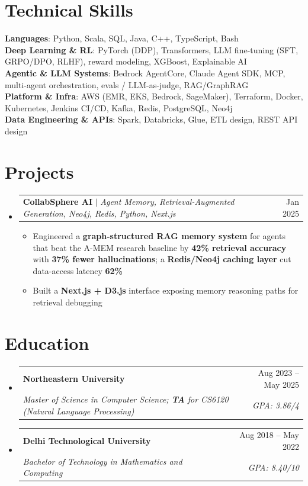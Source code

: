 \documentclass[10pt,letterpaper]{article}
\makeatletter
\newcommand{\resumeItem}[1]{
  \item\small{
    {#1 \vspace{-2pt}}
  }
}
\newcommand{\resumeSubheading}[4]{
  \vspace{-2pt}\item
    \begin{tabular*}{0.97\textwidth}[t]{l@{\extracolsep{\fill}}r}
      \textbf{#1} & #2 \\
      \textit{\small#3} & \textit{\small #4} \\
    \end{tabular*}\vspace{-7pt}
}
\newcommand{\resumeProjectHeading}[2]{
    \item
    \begin{tabular*}{0.97\textwidth}{l@{\extracolsep{\fill}}r}
      \small#1 & #2 \\
    \end{tabular*}\vspace{-7pt}
}
\newcommand{\resumeSubHeadingListStart}{\begin{itemize}[leftmargin=0.15in, label={}]}
\newcommand{\resumeSubHeadingListEnd}{\end{itemize}}
\newcommand{\resumeItemListStart}{\begin{itemize}}
\newcommand{\resumeItemListEnd}{\end{itemize}\vspace{-6pt}}
\makeatother
\begin{document}
\section{Technical Skills}
 \begin{itemize}[leftmargin=0.15in, label={}]
    \small{\item{
     \textbf{Languages}{: Python, Scala, SQL, Java, C++, TypeScript, Bash} \\

     \textbf{Deep Learning \& RL}{: PyTorch (DDP), Transformers, LLM fine-tuning (SFT, GRPO/DPO, RLHF), reward modeling, XGBoost, Explainable AI} \\

     \textbf{Agentic \& LLM Systems}{: Bedrock AgentCore, Claude Agent SDK, MCP, multi-agent orchestration, evals / LLM-as-judge, RAG/GraphRAG} \\

     \textbf{Platform \& Infra}{: AWS (EMR, EKS, Bedrock, SageMaker), Terraform, Docker, Kubernetes, Jenkins CI/CD, Kafka, Redis, PostgreSQL, Neo4j} \\

     \textbf{Data Engineering \& APIs}{: Spark, Databricks, Glue, ETL design, REST API design}
     }}
 \end{itemize}


\section{Projects}
    \resumeSubHeadingListStart

  \resumeProjectHeading
 {\textbf{CollabSphere AI} $|$ \emph{Agent Memory, Retrieval-Augmented Generation, Neo4j, Redis, Python, Next.js}}{Jan 2025}
 \resumeItemListStart
   \resumeItem{Engineered a \textbf{graph-structured RAG memory system} for agents that beat the A-MEM research baseline by \textbf{42\% retrieval accuracy} with \textbf{37\% fewer hallucinations}; a \textbf{Redis/Neo4j caching layer} cut data-access latency \textbf{62\%}}
   \resumeItem{Built a \textbf{Next.js + D3.js} interface exposing memory reasoning paths for retrieval debugging}
 \resumeItemListEnd

\resumeSubHeadingListEnd

\section{Education}
  \resumeSubHeadingListStart
    \resumeSubheading
      {Northeastern University}{Aug 2023 -- May 2025}
      {Master of Science in Computer Science; \textbf{TA} for CS6120 (Natural Language Processing)}{GPA: 3.86/4}
    \resumeSubheading
      {Delhi Technological University}{Aug 2018 -- May 2022}
      {Bachelor of Technology in Mathematics and Computing}{GPA: 8.40/10}
  \resumeSubHeadingListEnd
\end{document}
